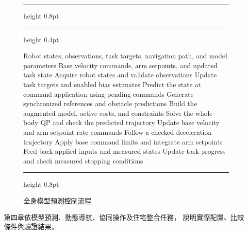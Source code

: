 \begin{figure}[!p]
\begin{lrbox}{\chThreeWorkflowAlgorithmBox}
\begin{minipage}{\linewidth}
    \vspace{0.5\baselineskip}
\begin{algorithm}[H]
    \ifdefined\RawFloats\RawFloats\fi
    \fontsize{11pt}{13pt}\selectfont
    \setlength{\abovecaptionskip}{3pt}
    \setlength{\belowcaptionskip}{3pt}
    \hrule height 0.8pt\relax
    \caption{全身模型預測控制流程}
    \label{alg:wholebody_predictive_control}
    \par\vspace{2pt}
    \hrule height 0.4pt\relax
    \vspace{4pt}
    \begin{algorithmic}[1]
        \Require Robot states, observations, task targets, navigation path, and model parameters
        \Ensure Base velocity commands, arm setpoints, and updated task state
            \State Acquire robot states and validate observations
                \State Update task targets and enabled bias estimates
                \State Predict the state at command application using pending commands
                \State Generate synchronized references and obstacle predictions
                \State Build the augmented model, active costs, and constraints
                \State Solve the whole-body QP and check the predicted trajectory
                    \State Update base velocity and arm setpoint-rate commands
                \Else
                    \State Follow a checked deceleration trajectory
                \EndIf
            \EndIf
            \State Apply base command limits and integrate arm setpoints
            \State Feed back applied inputs and measured states
            \State Update task progress and check measured stopping conditions
        \EndWhile
    \end{algorithmic}
    \par\vspace{4pt}
    \hrule height 0.8pt\relax
\end{algorithm}
    \end{minipage}
    \end{lrbox}
    \ifdim\dimexpr\ht\chThreeWorkflowAlgorithmBox+\dp\chThreeWorkflowAlgorithmBox\relax>0.98\textheight
        \resizebox*{!}{0.98\textheight}{\usebox{\chThreeWorkflowAlgorithmBox}}
    \else
        \usebox{\chThreeWorkflowAlgorithmBox}
    \fi
\end{figure}

第四章依模型預測、動態導航、協同操作及住宅整合任務，
說明實際配置、比較條件與驗證結果。
